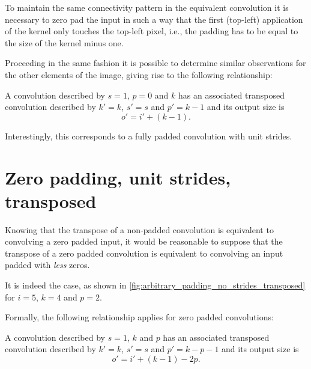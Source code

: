 To maintain the same connectivity pattern in the equivalent convolution it is
necessary to zero pad the input in such a way that the first (top-left)
application of the kernel only touches the top-left pixel, i.e., the padding
has to be equal to the size of the kernel minus one.

Proceeding in the same fashion it is possible to determine similar observations
for the other elements of the image, giving rise to the following relationship:

\begin{relationship}\label{rel:no_padding_no_strides_transposed}
A convolution described by $s = 1$, $p = 0$ and $k$ has an associated
transposed convolution described by $k' = k$, $s' = s$ and $p' = k - 1$ and its
output size is
\begin{equation*}
    o' = i' + (k - 1).
\end{equation*}
\end{relationship}

Interestingly, this corresponds to a fully padded convolution with unit
strides.

\section{Zero padding, unit strides, transposed}

Knowing that the transpose of a non-padded convolution is equivalent to
convolving a zero padded input, it would be reasonable to suppose that the
transpose of a zero padded convolution is equivalent to convolving an input
padded with {\em less\/} zeros.

It is indeed the case, as shown in
\autoref{fig:arbitrary_padding_no_strides_transposed} for $i = 5$, $k = 4$ and
$p = 2$.

Formally, the following relationship applies for zero padded convolutions:

\begin{relationship}\label{rel:arbitrary_padding_no_strides_transposed}
A convolution described by $s = 1$, $k$ and $p$ has an
associated transposed convolution described by $k' = k$, $s' = s$ and $p' = k -
p - 1$ and its output size is
\begin{equation*}
    o' = i' + (k - 1) - 2p.
\end{equation*}
\end{relationship}

